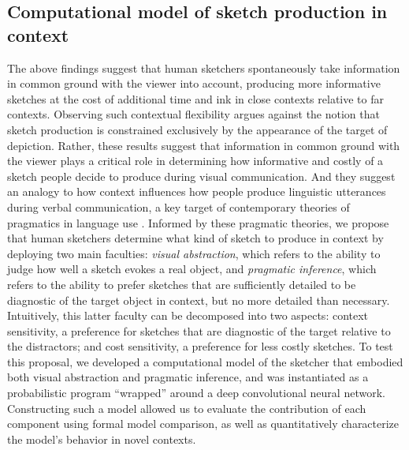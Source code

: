 \documentclass[9pt,twocolumn,twoside]{pnas-new}
\begin{document}




\subsection*{Computational model of sketch production in context}

The above findings suggest that human sketchers spontaneously take information in common ground with the viewer into account, producing more informative sketches at the cost of additional time and ink in close contexts relative to far contexts. 
Observing such contextual flexibility argues against the notion that sketch production is constrained exclusively by the appearance of the target of depiction. 
Rather, these results suggest that information in common ground with the viewer plays a critical role in determining how informative and costly of a sketch people decide to produce during visual communication. 
And they suggest an analogy to how context influences how people produce linguistic utterances during verbal communication, a key target of contemporary theories of pragmatics in language use \cite{grice1975syntax,goodman2016pragmatic}.
Informed by these pragmatic theories, we propose that human sketchers determine what kind of sketch to produce in context by deploying two main faculties: \textit{visual abstraction}, which refers to the ability to judge how well a sketch evokes a real object, and \textit{pragmatic inference}, which refers to the ability to prefer sketches that are sufficiently detailed to be diagnostic of the target object in context, but no more detailed than necessary. 
Intuitively, this latter faculty can be decomposed into two aspects: context sensitivity, a preference for sketches that are diagnostic of the target relative to the distractors; and cost sensitivity, a preference for less costly sketches. 
To test this proposal, we developed a computational model of the sketcher that embodied both visual abstraction and pragmatic inference, and was instantiated as a probabilistic program ``wrapped'' around a deep convolutional neural network. 
Constructing such a model allowed us to evaluate the contribution of each component using formal model comparison, as well as quantitatively characterize the model's behavior in novel contexts.
\end{document}
